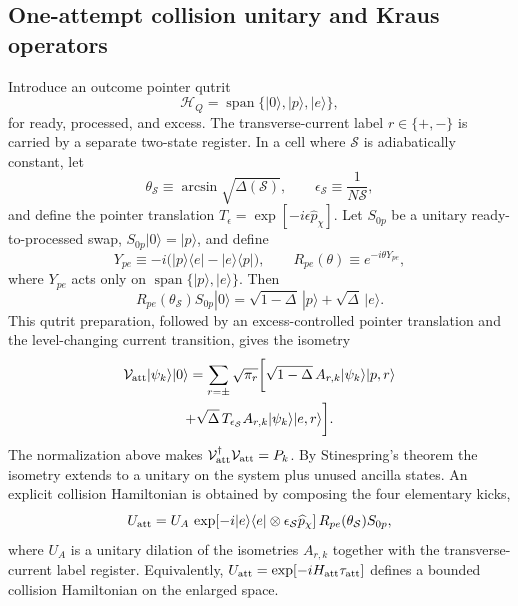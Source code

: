 \documentclass[aps,prd,twocolumn,10pt,superscriptaddress,nofootinbib]{revtex4-2}
\begin{document}
\subsection{One-attempt collision unitary and Kraus operators}

Introduce an outcome pointer qutrit
\begin{equation}
 \mathcal H_Q=\operatorname{span}\{|0\rangle,|p\rangle,|e\rangle\},
 \label{eq:pb_outcome_qutrit}
\end{equation}
for ready, processed, and excess.  The transverse-current label
$r\in\{+,-\}$ is carried by a separate two-state register.  In a cell where
$\mathcal S$ is adiabatically constant, let
\begin{equation}
 \theta_{\mathcal S}\equiv\arcsin\sqrt{\Delta(\mathcal S)},
 \qquad
 \epsilon_{\mathcal S}\equiv\frac{1}{N\mathcal S},
 \label{eq:pb_collision_parameters}
\end{equation}
and define the pointer translation
$T_{\epsilon}=\exp[-i\epsilon\widehat p_\chi]$.  Let $S_{0p}$ be a
unitary ready-to-processed swap, $S_{0p}|0\rangle=|p\rangle$, and define
\begin{equation}
 Y_{pe}\equiv-i\bigl(|p\rangle\langle e|-|e\rangle\langle p|\bigr),
 \qquad
 R_{pe}(\theta)\equiv e^{-i\theta Y_{pe}},
 \label{eq:pb_qutrit_rotation}
\end{equation}
where $Y_{pe}$ acts only on
$\operatorname{span}\{|p\rangle,|e\rangle\}$.  Then
\begin{equation}
 R_{pe}(\theta_{\mathcal S})S_{0p}|0\rangle
 =\sqrt{1-\Delta}\,|p\rangle+\sqrt{\Delta}\,|e\rangle.
 \label{eq:pb_qutrit_preparation}
\end{equation}
This qutrit preparation, followed by an excess-controlled pointer
translation and the level-changing current transition, gives the isometry
\begin{multline}
 \mathcal V_{\rm att}|\psi_k\rangle|0\rangle
 =\sum_{r=\pm}\sqrt{\pi_r}\bigg[
 \sqrt{1-\Delta}\,A_{r,k}|\psi_k\rangle|p,r\rangle\\
 +\sqrt{\Delta}\,T_{\epsilon_{\mathcal S}}
 A_{r,k}|\psi_k\rangle|e,r\rangle\bigg].
 \label{eq:pb_attempt_isometry}
\end{multline}
The normalization above makes
$\mathcal V_{\rm att}^{\dagger}\mathcal V_{\rm att}=P_k$.  By Stinespring's
theorem the isometry extends to a unitary on the system plus unused ancilla
states.  An explicit collision Hamiltonian is obtained by composing the
four elementary kicks,
\begin{equation}
 U_{\rm att}
 =U_A\,\exp[-i|e\rangle\langle e|\otimes
 \epsilon_{\mathcal S}\widehat p_\chi]\,
 R_{pe}(\theta_{\mathcal S})S_{0p},
 \label{eq:pb_collision_unitary}
\end{equation}
where $U_A$ is a unitary dilation of the isometries $A_{r,k}$ together with
the transverse-current label register.  Equivalently,
$U_{\rm att}=\exp[-iH_{\rm att}\tau_{\rm att}]$ defines a bounded collision
Hamiltonian on the enlarged space.
\end{document}
